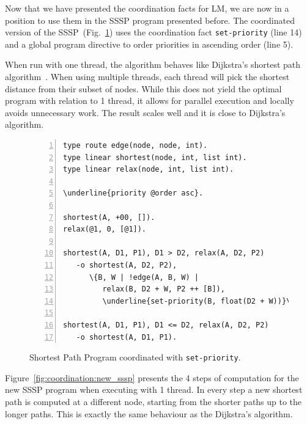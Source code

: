 Now that we have presented the coordination facts for LM, we are now in a
position to use them in the SSSP program presented before.  The coordinated
version of the SSSP~(Fig.~\ref{code:shortest_path_program_coord}) uses the
coordination fact \texttt{set-priority} (line 14) and a global program directive
to order priorities in ascending order (line 5).

When run with one thread, the algorithm behaves like Dijkstra's shortest path
algorithm~\cite{Dijkstra}. When using multiple threads, each thread will pick
the shortest distance from their subset of nodes.  While this does not yield the
optimal program with relation to 1 thread, it allows for parallel execution and
locally avoids unnecessary work. The result scales well and it is close to
Dijkstra's algorithm.

\begin{figure}[ht]
\begin{Verbatim}[numbers=left,xleftmargin=7mm,commandchars=\\\{\}]
type route edge(node, node, int).
type linear shortest(node, int, list int).
type linear relax(node, int, list int).

\underline{priority @order asc}.

shortest(A, +00, []).
relax(@1, 0, [@1]).

shortest(A, D1, P1), D1 > D2, relax(A, D2, P2)
   -o shortest(A, D2, P2),
      \{B, W | !edge(A, B, W) |
         relax(B, D2 + W, P2 ++ [B]),
         \underline{set-priority(B, float(D2 + W))}\}.

shortest(A, D1, P1), D1 <= D2, relax(A, D2, P2)
   -o shortest(A, D1, P1).
\end{Verbatim}
   \caption{Shortest Path Program coordinated with \texttt{set-priority}.}
   \label{code:shortest_path_program_coord}
\end{figure}

Figure~\ref{fig:coordination:new_sssp} presents the 4 steps of computation for
the new SSSP program when executing with 1 thread. In every step a new shortest
path is computed at a different node, starting from the shorter paths up to
the longer paths. This is exactly the same behaviour as the Dijkstra's
algorithm.

